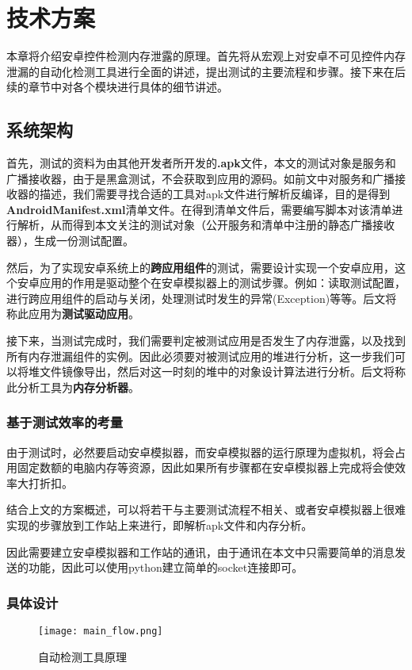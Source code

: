 
\chapter{技术方案}\label{chapter_system}
本章将介绍安卓控件检测内存泄露的原理。首先将从宏观上对安卓不可见控件内存泄漏的自动化检测工具进行全面的讲述，提出测试的主要流程和步骤。接下来在后续的章节中对各个模块进行具体的细节讲述。

\section{系统架构}


首先，测试的资料为由其他开发者所开发的\textbf{.apk}文件，本文的测试对象是服务和广播接收器，由于是黑盒测试，不会获取到应用的源码。如前文中对服务和广播接收器的描述，我们需要寻找合适的工具对apk文件进行解析反编译，目的是得到\textbf{AndroidManifest.xml}清单文件。在得到清单文件后，需要编写脚本对该清单进行解析，从而得到本文关注的测试对象（公开服务和清单中注册的静态广播接收器），生成一份测试配置。

然后，为了实现安卓系统上的\textbf{跨应用组件}的测试，需要设计实现一个安卓应用，这个安卓应用的作用是驱动整个在安卓模拟器上的测试步骤。例如：读取测试配置，进行跨应用组件的启动与关闭，处理测试时发生的异常(Exception)等等。后文将称此应用为\textbf{测试驱动应用}。

接下来，当测试完成时，我们需要判定被测试应用是否发生了内存泄露，以及找到所有内存泄漏组件的实例。因此必须要对被测试应用的堆进行分析，这一步我们可以将堆文件镜像导出，然后对这一时刻的堆中的对象设计算法进行分析。后文将称此分析工具为\textbf{内存分析器}。

\subsection{基于测试效率的考量}

由于测试时，必然要启动安卓模拟器，而安卓模拟器的运行原理为虚拟机，将会占用固定数额的电脑内存等资源，因此如果所有步骤都在安卓模拟器上完成将会使效率大打折扣。

结合上文的方案概述，可以将若干与主要测试流程不相关、或者安卓模拟器上很难实现的步骤放到工作站上来进行，即解析apk文件和内存分析。

因此需要建立安卓模拟器和工作站的通讯，由于通讯在本文中只需要简单的消息发送的功能，因此可以使用python建立简单的socket连接即可。

\subsection{具体设计}
\begin{figure}[htbp]
	\centering
	\texttt{[image: main\_flow.png]} %
	\caption{自动检测工具原理}
	\label{fig:flow}
\end{figure}

